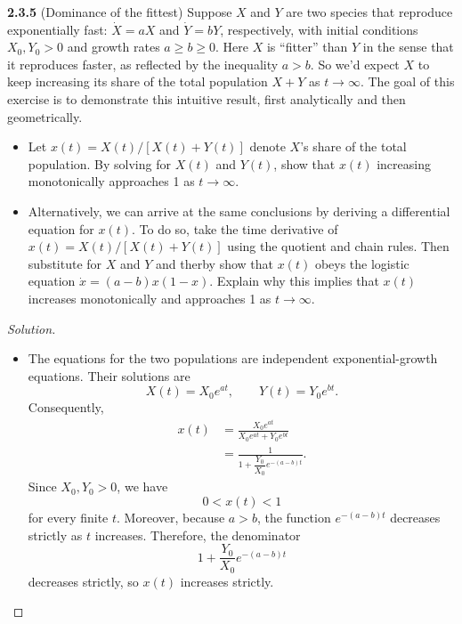 \documentclass[10pt]{amsart}
\newenvironment{solution}
{\begin{proof}[Solution]}
{\end{proof}}
\begin{document}
\begin{onehalfspace}
        \noindent\textbf{2.3.5} (Dominance of the fittest) Suppose $X$ and $Y$ are two species
        that reproduce exponentially fast: $\dot{X} = aX$ and $\dot{Y} = bY$, respectively, with
        initial conditions $X_0,Y_0 > 0$ and growth rates $a\ge b\ge 0$.
        Here $X$ is ``fitter'' than $Y$ in the sense that it reproduces faster, as reflected by
        the inequality $a > b$.
        So we'd expect $X$ to keep increasing its share of the total population $X + Y$ as
        $t\rightarrow\infty$.
        The goal of this exercise is to demonstrate this intuitive result, first analytically and
        then geometrically.
        \begin{itemize}
            \item[(a)] Let $x(t) = X(t)/[X(t) + Y(t)]$ denote $X$'s share of the total population.
            By solving for $X(t)$ and $Y(t)$, show that $x(t)$ increasing monotonically approaches
            1 as $t\rightarrow\infty$.
            \item[(b)] Alternatively, we can arrive at the same conclusions by deriving a differential
            equation for $x(t)$.
            To do so, take the time derivative of $x(t) = X(t)/[X(t) + Y(t)]$ using the quotient and
            chain rules.
            Then substitute for $X$ and $Y$ and therby show that $x(t)$ obeys the logistic equation
            $\dot{x} = (a - b)x(1 - x)$.
            Explain why this implies that $x(t)$ increases monotonically and approaches 1 as
            $t\rightarrow\infty$.
        \end{itemize}

        \begin{solution}
            \begin{itemize}
                \item[(a)] The equations for the two populations are independent
                exponential-growth equations. Their solutions are
                \[
                    X(t)=X_0e^{at},
                    \qquad
                    Y(t)=Y_0e^{bt}.
                \]
                Consequently,
                \begin{align*}
                    x(t)
                    &=\frac{X_0e^{at}}{X_0e^{at}+Y_0e^{bt}}\\
                    &=\frac{1}{1+\dfrac{Y_0}{X_0}e^{-(a-b)t}}.
                \end{align*}
                Since \(X_0,Y_0>0\), we have
                \[
                    0<x(t)<1
                \]
                for every finite \(t\). Moreover, because \(a>b\), the function
                \(e^{-(a-b)t}\) decreases strictly as \(t\) increases. Therefore, the
                denominator
                \[
                    1+\frac{Y_0}{X_0}e^{-(a-b)t}
                \]
                decreases strictly, so \(x(t)\) increases strictly.


\end{itemize}
\end{solution}
\end{onehalfspace}
\end{document}
